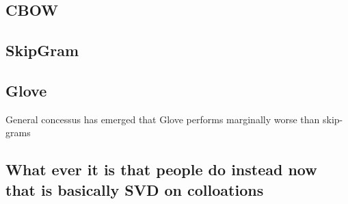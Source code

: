 \documentclass[12pt,parskip]{komatufte}
\begin{document}
\subsection{CBOW}
\textcite{mikolov2013linguisticsubstructures,mikolovSkip}

\subsection{SkipGram}
\textcite{mikolov2013linguisticsubstructures,mikolovSkip}


\subsection{Glove}

General concessus has emerged that Glove performs marginally worse than skip-grams

\subsection{What ever it is that people do instead now that is basically SVD on colloations}



\end{document}
